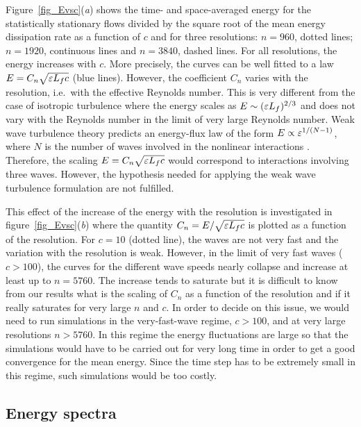 Figure~\ref{fig_Evsc}(\textit{a}) shows the time- and space-averaged
energy for the statistically stationary flows divided by the square
root of the mean energy dissipation rate as a function of $c$ and for
three resolutions: $n = 960$, dotted lines; $n = 1920$, continuous
lines and $n = 3840$, dashed lines.
%
For all resolutions, the energy increases with $c$.  More precisely,
the curves can be well fitted to a law $E = C_n \sqrt{\varepsilon L_f c}$
(blue lines).  However, the coefficient $C_n$ varies with the
resolution, i.e.\ with the effective Reynolds number.
%
This is very different from the case of isotropic turbulence where the
energy scales as $E \sim (\varepsilon L_f)^{2/3}$ and does not vary with the
Reynolds number in the limit of very large Reynolds number.
%
Weak wave turbulence theory predicts an energy-flux law of the form $E
\propto \varepsilon^{1/(N-1)}$, where $N$ is the number of waves involved
in the nonlinear interactions \cite[]{Nazarenko2011}.  Therefore, the
scaling $E = C_n \sqrt{\varepsilon L_f c}$ would correspond to interactions
involving three waves.
%
However, the hypothesis needed for applying the weak wave turbulence
formulation are not fulfilled.


This effect of the increase of the energy with the resolution is
investigated in figure~\ref{fig_Evsc}(\textit{b}) where the quantity
$C_n = E/\sqrt{\varepsilon L_f c}$ is plotted as a function of the
resolution.
%
For $c = 10$ (dotted line), the waves are not very fast and the
variation with the resolution is weak.
%
However, in the limit of very fast waves ($c>100$), the curves for the
different wave speeds nearly collapse and increase at least up to $n =
5760$.  The increase tends to saturate but it is difficult to know
from our results what is the scaling of $C_n$ as a function of the
resolution and if it really saturates for very large $n$ and $c$.
%
In order to decide on this issue, we would need to run simulations in
the very-fast-wave regime, $c>100$, and at very large resolutions $n >
5760$.  In this regime the energy fluctuations are large so
that the simulations would have to be carried out for very long time
in order to get a good convergence for the mean energy.  Since the
time step has to be extremely small in this regime, such simulations
would be too costly.





\subsection{Energy spectra}


